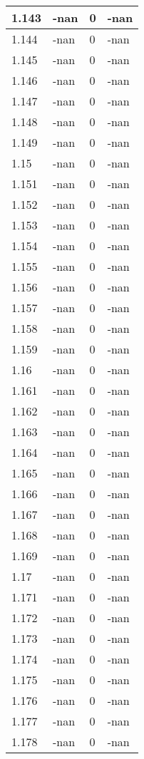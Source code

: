 \documentclass[a4paper,14pt]{extarticle}
\begin{document}
\begin{longtable}{||m{3cm}||m{3cm}|m{3cm}||m{3cm}||}
\hline
1.143 & -nan & 0 & -nan\\
\hline
1.144 & -nan & 0 & -nan\\
\hline
1.145 & -nan & 0 & -nan\\
\hline
1.146 & -nan & 0 & -nan\\
\hline
1.147 & -nan & 0 & -nan\\
\hline
1.148 & -nan & 0 & -nan\\
\hline
1.149 & -nan & 0 & -nan\\
\hline
1.15 & -nan & 0 & -nan\\
\hline
1.151 & -nan & 0 & -nan\\
\hline
1.152 & -nan & 0 & -nan\\
\hline
1.153 & -nan & 0 & -nan\\
\hline
1.154 & -nan & 0 & -nan\\
\hline
1.155 & -nan & 0 & -nan\\
\hline
1.156 & -nan & 0 & -nan\\
\hline
1.157 & -nan & 0 & -nan\\
\hline
1.158 & -nan & 0 & -nan\\
\hline
1.159 & -nan & 0 & -nan\\
\hline
1.16 & -nan & 0 & -nan\\
\hline
1.161 & -nan & 0 & -nan\\
\hline
1.162 & -nan & 0 & -nan\\
\hline
1.163 & -nan & 0 & -nan\\
\hline
1.164 & -nan & 0 & -nan\\
\hline
1.165 & -nan & 0 & -nan\\
\hline
1.166 & -nan & 0 & -nan\\
\hline
1.167 & -nan & 0 & -nan\\
\hline
1.168 & -nan & 0 & -nan\\
\hline
1.169 & -nan & 0 & -nan\\
\hline
1.17 & -nan & 0 & -nan\\
\hline
1.171 & -nan & 0 & -nan\\
\hline
1.172 & -nan & 0 & -nan\\
\hline
1.173 & -nan & 0 & -nan\\
\hline
1.174 & -nan & 0 & -nan\\
\hline
1.175 & -nan & 0 & -nan\\
\hline
1.176 & -nan & 0 & -nan\\
\hline
1.177 & -nan & 0 & -nan\\
\hline
1.178 & -nan & 0 & -nan\\

\end{longtable}
\end{document}
